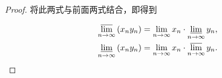 \begin{proof}
	
	将此两式与前面两式结合，即得到
	
	$$
	\begin{aligned}
		& \varlimsup_{n \rightarrow \infty}\left(x_n y_n\right)=\lim _{n \rightarrow \infty} x_n \cdot \varliminf\limits _{n \rightarrow \infty} y_n, \\
		& \varliminf\limits _{n \rightarrow \infty}\left(x_n y_n\right)=\lim _{n \rightarrow \infty} x_n \cdot \varlimsup_{n \rightarrow \infty} y_n .
	\end{aligned}
	$$
\end{proof}

